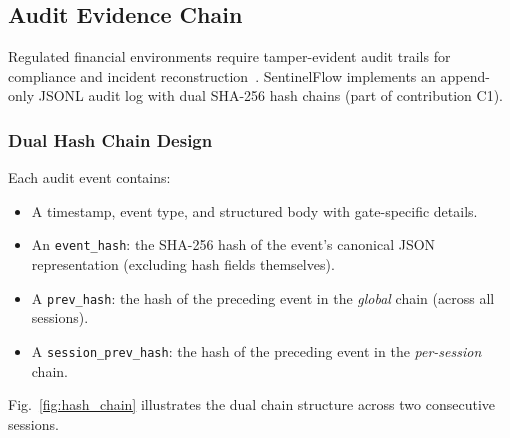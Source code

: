 \documentclass[journal]{IEEEtran}
\begin{document}
\subsection{Audit Evidence Chain}
\label{Sect:Audit_Chain}

Regulated financial environments require tamper-evident audit trails for compliance and incident reconstruction~\cite{nist_ai_rmf}. SentinelFlow implements an append-only JSONL audit log with dual SHA-256 hash chains (part of contribution C1).

\subsubsection{Dual Hash Chain Design}

Each audit event contains:
\begin{itemize}
    \item A timestamp, event type, and structured body with gate-specific details.
    \item An \texttt{event\_hash}: the SHA-256 hash of the event's canonical JSON representation (excluding hash fields themselves).
    \item A \texttt{prev\_hash}: the hash of the preceding event in the \textit{global} chain (across all sessions).
    \item A \texttt{session\_prev\_hash}: the hash of the preceding event in the \textit{per-session} chain.
\end{itemize}

Fig.~\ref{fig:hash_chain} illustrates the dual chain structure across two consecutive sessions.
\end{document}
